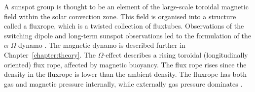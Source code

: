 

A sunspot group is thought to be an element of the large-scale toroidal magnetic field within the solar convection zone. This field is organised into a structure called a \gls{fluxrope}, which is a twisted collection of \glspl{fluxtube}. Observations of the switching dipole and long-term sunspot observations led to the formulation of the $\alpha$-$\Omega$ dynamo \citep{Parker:1957}. The magnetic dynamo is described further in Chapter~\ref{chapter:theory}. The $\Omega$-effect describes a rising toroidal (longitudinally oriented) flux rope, affected by magnetic buoyancy. The flux rope rises since the density in the \gls{fluxrope} is lower than the ambient density. The \gls{fluxrope} has both gas and magnetic pressure internally, while externally gas pressure dominates \citep{Parker:1955b}.

